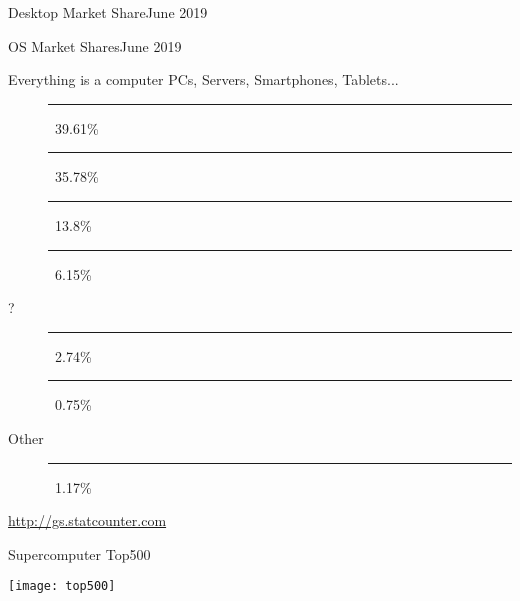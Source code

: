\begin{frame}{Desktop Market Share}{June 2019}
\end{frame}

\begin{frame}{OS Market Shares}{June 2019}
  \begin{block}{Everything is a computer}
    PCs, Servers, Smartphones, Tablets...
    \begin{description}
    \item[\android] \textcolor{Green}{\rule{.3961\textwidth}{2mm}}\,
      39.61\%
    \item[\win] \textcolor{SkyBlue}{\rule{.3578\textwidth}{2mm}}\, 35.78\%
    \item[{\iOS}] \textcolor{orange}{\rule{.138\textwidth}{2mm}}\, 13.8\%
    \item[\apple] \textcolor{LightGray}{\rule{.0615\textwidth}{2mm}}\, 6.15\%
    \item[?] \textcolor{gray}{\rule{.0274\textwidth}{2mm}}\, 2.74\%
    \item[\linux] \rule{.0075\textwidth}{2mm}\, 0.75\%
    \item[Other] \textcolor{gray}{\rule{.0117\textwidth}{2mm}}\, 1.17\%
    \end{description}
  \end{block}
  \begin{flushright}
    \tiny \url{http://gs.statcounter.com}
  \end{flushright}
\end{frame}

\begin{frame}{Supercomputer Top500}
\begin{center}
  \texttt{[image: top500]}
\end{center}
\end{frame}

